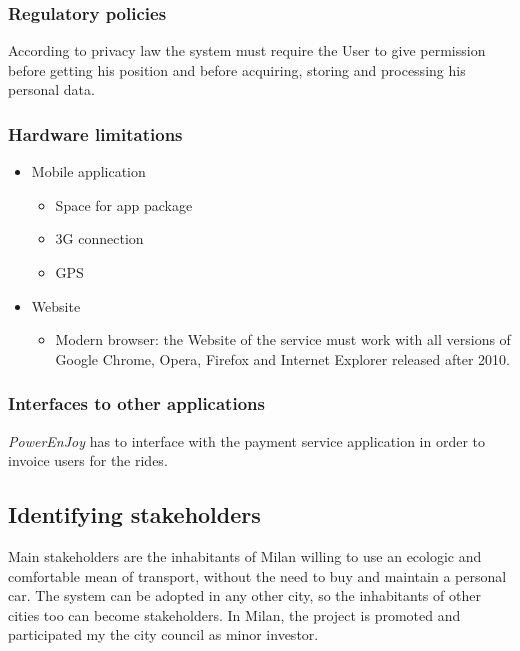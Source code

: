 \documentclass{article}
\begin{document}
			\subsubsection{Regulatory policies}
				According to privacy law the system must require the User to give permission before getting his position and before acquiring, storing and processing his personal data.
			
			\subsubsection{Hardware limitations}
				\begin{itemize}
					\item Mobile application
						\begin{itemize}
							\item Space for app package
							\item 3G connection
							\item GPS
						\end{itemize}
					\item Website
						\begin{itemize}
							\item Modern browser: the Website of the service must work with all versions of Google Chrome, Opera, Firefox and Internet Explorer released after 2010.	
						\end{itemize}
				\end{itemize}
			
			
			\subsubsection{Interfaces to other applications}
			\textit{PowerEnJoy} has to interface with the payment service application in order to invoice users for the rides. 
						

		\subsection{Identifying stakeholders}
			Main stakeholders are the inhabitants of Milan willing to use an ecologic and comfortable mean of transport, without the need to buy and maintain a personal car.
			The system can be adopted in any other city, so the inhabitants of other cities too can become stakeholders.
			In Milan, the project is promoted and participated my the city council as minor investor.


	\newpage
\end{document}
